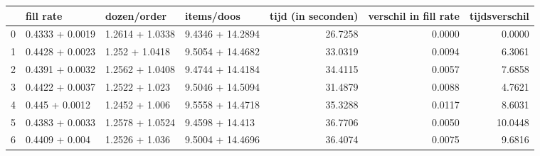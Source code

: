\begin{tabular}{llllrrr}
\toprule
{} &        fill rate &      dozen/order &        items/doos &  tijd (in seconden) &  verschil in fill rate &  tijdsverschil \\
\midrule
0 &  0.4333 + 0.0019 &  1.2614 + 1.0338 &  9.4346 + 14.2894 &             26.7258 &                 0.0000 &         0.0000 \\
1 &  0.4428 + 0.0023 &   1.252 + 1.0418 &  9.5054 + 14.4682 &             33.0319 &                 0.0094 &         6.3061 \\
2 &  0.4391 + 0.0032 &  1.2562 + 1.0408 &  9.4744 + 14.4184 &             34.4115 &                 0.0057 &         7.6858 \\
3 &  0.4422 + 0.0037 &   1.2522 + 1.023 &  9.5046 + 14.5094 &             31.4879 &                 0.0088 &         4.7621 \\
4 &   0.445 + 0.0012 &   1.2452 + 1.006 &  9.5558 + 14.4718 &             35.3288 &                 0.0117 &         8.6031 \\
5 &  0.4383 + 0.0033 &  1.2578 + 1.0524 &   9.4598 + 14.413 &             36.7706 &                 0.0050 &        10.0448 \\
6 &   0.4409 + 0.004 &   1.2526 + 1.036 &  9.5004 + 14.4696 &             36.4074 &                 0.0075 &         9.6816 \\
\bottomrule
\end{tabular}
